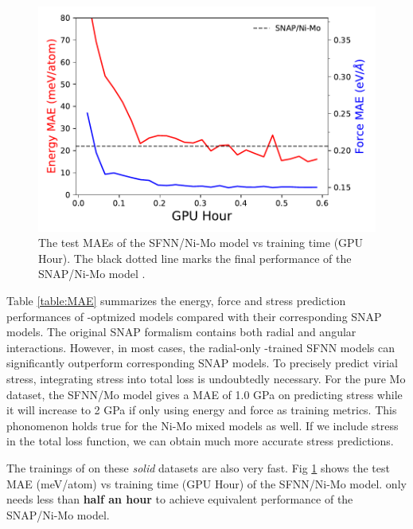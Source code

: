 \documentclass[preprint]{revtex4-2}
\begin{document}
\begin{figure}[h!]
    \centering
    \includegraphics[scale=0.8]{figures/Fig5-snap.pdf}
\caption{\label{fig:snap_gpu_train_speed} The test MAEs of the SFNN/Ni-Mo model 
vs training time (GPU Hour). The black dotted line marks the final performance 
of the SNAP/Ni-Mo model \cite{SNAP_2018}.}
\end{figure}

Table \ref{table:MAE} summarizes the energy, force and stress prediction 
performances of \tensoralloy{}-optmized models compared with their corresponding 
SNAP models. The original SNAP formalism contains both radial and angular 
interactions. However, in most cases, the radial-only \tensoralloy{}-trained 
SFNN models can significantly outperform corresponding SNAP models. To precisely
predict virial stress, integrating stress into total loss is undoubtedly 
necessary. For the pure Mo dataset, the SFNN/Mo model gives a MAE of 1.0 GPa on 
predicting stress while it will increase to 2 GPa if only using energy and force 
as training metrics. This phonomenon holds true for the Ni-Mo mixed models as 
well. If we include stress in the total loss function, we can obtain much more 
accurate stress predictions.

The trainings of \tensoralloy{} on these \textit{solid} datasets are also very 
fast. Fig \ref{fig:snap_gpu_train_speed} shows the test MAE (meV/atom) vs 
training time (GPU Hour) of the SFNN/Ni-Mo model. \tensoralloy{} only needs less 
than \textbf{half an hour} to achieve equivalent performance of the 
SNAP/Ni-Mo model.
\end{document}
